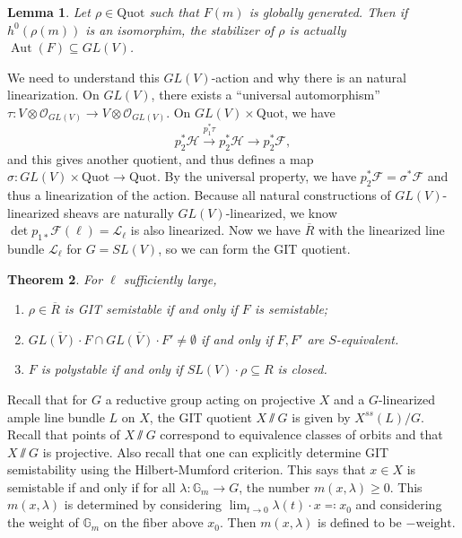 \documentclass[leqno, openany]{memoir}
\newtheorem{thm}{Theorem}[section]
\newtheorem{lem}[thm]{Lemma}
\theoremstyle{definition}
\theoremstyle{remark}
\theoremstyle{plain}
\theoremstyle{definition}
\theoremstyle{remark}
\newcommand{\mc}[1]{\mathcal{#1}}
\newcommand{\mr}[1]{\mathrm{#1}}
\newcommand{\ol}[1]{\overline{#1}}
\DeclareMathOperator{\Aut}{Aut}
\begin{document}
\begin{lem}
    Let $\rho \in \mr{Quot}$ such that $F(m)$ is globally generated. Then if $h^0(\rho(m))$ is an isomorphim, the stabilizer of $\rho$ is actually $\Aut(F) \subseteq GL(V)$.
\end{lem}

We need to understand this $GL(V)$-action and why there is an natural linearization. On $GL(V)$, there exists a ``universal automorphism'' $\tau \colon V \otimes \mc{O}_{GL(V)} \to V \otimes \mc{O}_{GL(V)}$. On $GL(V) \times \mr{Quot}$, we have
\[ p_2^* \mc{H} \xrightarrow{p_1^* \tau} p_2^* \mc{H} \to p_2^* \mc{F}, \]
and this gives another quotient, and thus defines a map $\sigma \colon GL(V) \times \mr{Quot} \to \mr{Quot}$. By the universal property, we have $p_2^* \mc{F} = \sigma^* \mc{F}$ and thus a linearization of the action. Because all natural constructions of $GL(V)$-linearized sheavs are naturally $GL(V)$-linearized, we know $\det p_{1*} \mc{F}(\ell) = \mc{L}_{\ell}$ is also linearized. Now we have $\ol{R}$ with the linearized line bundle $\mc{L}_{\ell}$ for $G = SL(V)$, so we can form the GIT quotient.

\begin{thm}
    For $\ell$ sufficiently large,
    \begin{enumerate}
        \item $\rho \in \ol{R}$ is GIT semistable if and only if $F$ is semistable;
        \item $\ol{GL(V) \cdot F} \cap \ol{GL(V) \cdot F'} \neq \emptyset$ if and only if $F, F'$ are $S$-equivalent.
        \item $F$ is polystable if and only if $SL(V) \cdot \rho \subseteq R$ is closed.
    \end{enumerate}
\end{thm}

Recall that for $G$ a reductive group acting on projective $X$ and a $G$-linearized ample line bundle $L$ on $X$, the GIT quotient $X \sslash G$ is given by $X^{ss}(L) / G$. Recall that points of $X \sslash G$ correspond to equivalence classes of orbits and that $X \sslash G$ is projective. Also recall that one can explicitly determine GIT semistability using the Hilbert-Mumford criterion. This says that $x \in X$ is semistable if and only if for all $\lambda \colon \mathbb{G}_m \to G$, the number $m(x, \lambda) \geq 0$. This $m(x, \lambda)$ is determined by considering $\lim_{t \to 0} \lambda(t) \cdot x \eqqcolon x_0$ and considering the weight of $\mathbb{G}_m$ on the fiber above $x_0$. Then $m(x, \lambda)$ is defined to be $- \text{weight}$.
\end{document}
